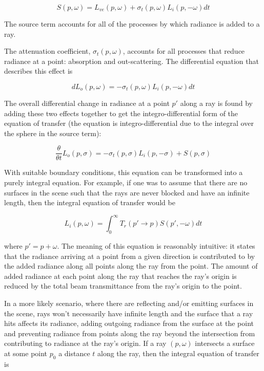 \documentclass{article}
\begin{document}
\begin{equation}
S(p,\omega) = L_{ve}(p,\omega) + \sigma_{t}(p,\omega)L_{i}(p,-\omega)dt
\end{equation}

The source term accounts for all of the processes by which radiance is added to a ray.

The attenuation coefficient, $\sigma_{t}(p,\omega)$, accounts for all processes that reduce radiance at a point: absorption and out-scattering. The differential equation that describes this effect is

\begin{equation}
dL_{o}(p,\omega) = -\sigma_{t}(p,\omega)L_{i}(p,-\omega)dt
\end{equation}

The overall differential change in radiance at a point $p'$ along a ray is found by adding these two effects together to get the integro-differential form of the equation of transfer (the equation is integro-differential due to the integral over the sphere in the source term):

\begin{equation}
\frac{\theta}{\theta t}L_{o}(p,\sigma) = -\sigma_{t}(p,\sigma)L_{i}(p,-\sigma) + S(p,\sigma)
\end{equation}

With suitable boundary conditions, this equation can be transformed into a purely integral equation. For example, if one was to assume that there are no surfaces in the scene such that the rays are never blocked and have an infinite length, then the integral equation of transfer would be

\begin{equation}
L_{i}(p,\omega) = \int_0^\infty T_{r}(p' \rightarrow p)S(p', -\omega)dt
\end{equation}

where $p' = p + \omega$. The meaning of this equation is reasonably intuitive: it states that the radiance arriving at a point from a given direction is contributed to by the added radiance along all points along the ray from the point. The amount of added radiance at each point along the ray that reaches the ray's origin is reduced by the total beam transmittance from the ray's origin to the point.

In a more likely scenario, where there are reflecting and/or emitting surfaces in the scene, rays won't necessarily have infinite length and the surface that a ray hits affects its radiance, adding outgoing radiance from the surface at the point and preventing radiance from points along the ray beyond the intersection from contributing to radiance at the ray's origin. If a ray $(p,\omega)$ intersects a surface at some point $p_{0}$ a distance $t$ along the ray, then the integral equation of transfer is
\end{document}
